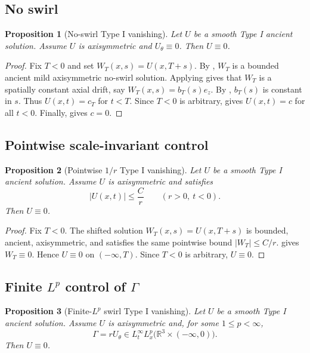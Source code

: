 \documentclass[11pt]{amsart}
\theoremstyle{plain}
\newtheorem{proposition}[proposition]{Proposition}
\theoremstyle{definition}
\theoremstyle{remark}
\numberwithin{equation}{section}
\begin{document}
\subsection{No swirl}

\begin{proposition}[No-swirl Type I vanishing]\label{p3:prop:noswirl-typeI}
Let \(U\) be a smooth Type I ancient solution.  Assume \(U\) is axisymmetric
and \(U_\theta\equiv0\).  Then \(U\equiv0\).
\end{proposition}

\begin{proof}
Fix \(T<0\) and set \(W_T(x,s)=U(x,T+s)\).  By ,
\(W_T\) is a bounded ancient mild axisymmetric no-swirl solution.  Applying
 gives that \(W_T\) is a spatially constant axial
drift, say \(W_T(x,s)=b_T(s)e_z\).  By
, \(b_T(s)\) is constant in \(s\).  Thus
\(U(x,t)=c_T\) for \(t<T\).  Since \(T<0\) is arbitrary,
 gives \(U(x,t)=c\) for all \(t<0\).  Finally,
 gives \(c=0\).
\end{proof}

\subsection{Pointwise scale-invariant control}

\begin{proposition}[Pointwise \(1/r\) Type I vanishing]\label{p3:prop:pointwise-typeI}
Let \(U\) be a smooth Type I ancient solution.  Assume \(U\) is axisymmetric
and satisfies
\[
   |U(x,t)|\le \frac{C}{r}
   \qquad(r>0,\ t<0).
\]
Then \(U\equiv0\).
\end{proposition}

\begin{proof}
Fix \(T<0\).  The shifted solution \(W_T(x,s)=U(x,T+s)\) is bounded, ancient,
axisymmetric, and satisfies the same pointwise bound \(|W_T|\le C/r\).
 gives \(W_T\equiv0\).  Hence \(U\equiv0\) on
\((-\infty,T)\).  Since \(T<0\) is arbitrary, \(U\equiv0\).
\end{proof}

\subsection{\texorpdfstring{Finite \(L^p\) control of \(\Gamma\)}
{Finite Lp control of Gamma}}

\begin{proposition}[Finite-\(L^p\) swirl Type I vanishing]
\label{p3:prop:lp-swirl-typeI}
Let \(U\) be a smooth Type I ancient solution.  Assume \(U\) is axisymmetric
and, for some \(1\le p<\infty\),
\[
   \Gamma=rU_\theta\in L_t^\infty L_x^p
   \bigl(\mathbb R^3\times(-\infty,0)\bigr).
\]
Then \(U\equiv0\).
\end{proposition}
\end{document}
